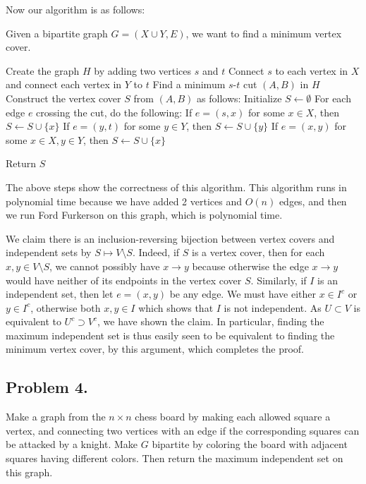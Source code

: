 \documentclass[12pt]{article}
\theoremstyle{definitionstyle}
\begin{document}
    Now our algorithm is as follows:
    
    Given a bipartite graph $G = (X \cup Y, E)$, we want to find a minimum vertex cover.

    \begin{algorithm}[H]
    \SetAlgoLined

    Create the graph $H$ by adding two vertices $s$ and $t$\;
    Connect $s$ to each vertex in $X$ and connect each vertex in $Y$ to $t$\;
    Find a minimum $s$-$t$ cut $(A,B)$ in $H$\;
    Construct the vertex cover $S$ from $(A,B)$ as follows:\;
    \quad Initialize $S \gets \emptyset$\;
    \quad For each edge $e$ crossing the cut, do the following:\;
    \quad \quad If $e = (s,x)$ for some $x \in X$, then $S \gets S \cup \{x\}$\;
    \quad \quad If $e = (y,t)$ for some $y \in Y$, then $S \gets S \cup \{y\}$\;
    \quad \quad If $e = (x,y)$ for some $x \in X, y \in Y$, then $S \gets S \cup \{x\}$\;

    Return $S$\;

    \end{algorithm}
    The above steps show the correctness of this algorithm. This algorithm runs in polynomial time because we have added 2 vertices and $O(n)$ edges, and then we run Ford Furkerson on this graph, which is polynomial time. 

    We claim there is an inclusion-reversing bijection between vertex covers and independent sets by $S \mapsto V \setminus S$. Indeed, if $S$ is a vertex cover, then for each $x, y \in V \setminus S$, we cannot possibly have $x \to y$ because otherwise the edge $x \to y$ would have neither of its endpoints in the vertex cover $S$. Similarly, if $I$ is an independent set, then let $e = (x,y)$ be any edge. We must have either $x \in I^c$ or $y \in I^c$, otherwise both $x, y \in I$ which shows that $I$ is not independent. As $U \subset V$ is equivalent to $U^c \supset V^c$, we have shown the claim. In particular, finding the maximum independent set is thus easily seen to be equivalent to finding the minimum vertex cover, by this argument, which completes the proof.

    \subsection*{Problem 4.}
    Make a graph from the $n \times n$ chess board by making each allowed square a vertex, and connecting two vertices with an edge if the corresponding squares can be attacked by a knight. Make $G$ bipartite by coloring the board with adjacent squares having different colors. Then return the maximum independent set on this graph. 
    
\end{document}

